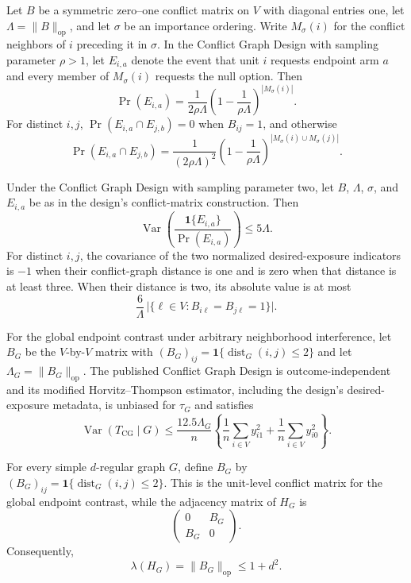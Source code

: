 Let \(B\) be a symmetric zero--one conflict matrix on \(V\) with diagonal entries one, let \(\Lambda=\|B\|_{\mathrm{op}}\), and let \(\sigma\) be an importance ordering.  Write \(M_\sigma(i)\) for the conflict neighbors of \(i\) preceding it in \(\sigma\).  In the Conflict Graph Design with sampling parameter \(\rho>1\), let \(E_{i,a}\) denote the event that unit \(i\) requests endpoint arm \(a\) and every member of \(M_\sigma(i)\) requests the null option.  Then
\[
\Pr(E_{i,a})=\frac{1}{2\rho\Lambda}
\left(1-\frac{1}{\rho\Lambda}\right)^{|M_\sigma(i)|}.
\]
For distinct \(i,j\), \(\Pr(E_{i,a}\cap E_{j,b})=0\) when \(B_{ij}=1\), and otherwise
\[
\Pr(E_{i,a}\cap E_{j,b})=\frac{1}{(2\rho\Lambda)^2}
\left(1-\frac{1}{\rho\Lambda}\right)^{|M_\sigma(i)\cup M_\sigma(j)|}.
\]

Under the Conflict Graph Design with sampling parameter two, let \(B\), \(\Lambda\), \(\sigma\), and \(E_{i,a}\) be as in the design's conflict-matrix construction.  Then
\[
\operatorname{Var}\!\left(\frac{\mathbf 1\{E_{i,a}\}}{\Pr(E_{i,a})}\right)\le5\Lambda.
\]
For distinct \(i,j\), the covariance of the two normalized desired-exposure indicators is \(-1\) when their conflict-graph distance is one and is zero when that distance is at least three.  When their distance is two, its absolute value is at most
\[
\frac{6}{\Lambda}\,
\bigl|\{\ell\in V:B_{i\ell}=B_{j\ell}=1\}\bigr|.
\]

For the global endpoint contrast under arbitrary neighborhood interference, let \(B_G\) be the \(V\)-by-\(V\) matrix with \((B_G)_{ij}=\mathbf 1\{\operatorname{dist}_G(i,j)\le2\}\) and let \(\Lambda_G=\|B_G\|_{\mathrm{op}}\).  The published Conflict Graph Design is outcome-independent and its modified Horvitz--Thompson estimator, including the design's desired-exposure metadata, is unbiased for \(\tau_G\) and satisfies
\[
\operatorname{Var}(T_{\mathrm{CG}}\mid G)
\le \frac{12.5\Lambda_G}{n}
\left\{\frac1n\sum_{i\in V}y_{i1}^2+
\frac1n\sum_{i\in V}y_{i0}^2\right\}.
\]

For every simple \(d\)-regular graph \(G\), define \(B_G\) by \((B_G)_{ij}=\mathbf 1\{\operatorname{dist}_G(i,j)\le2\}\).  This is the unit-level conflict matrix for the global endpoint contrast, while the adjacency matrix of \(H_G\) is
\[
\begin{pmatrix}0&B_G\\B_G&0\end{pmatrix}.
\]
Consequently,
\[
\lambda(H_G)=\|B_G\|_{\mathrm{op}}\le1+d^2.
\]

